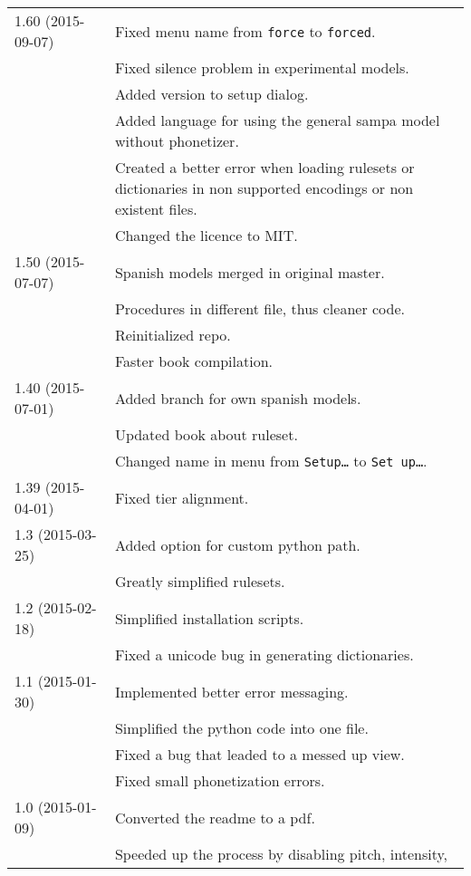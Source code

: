 \begin{longtable}{|p{0.22\linewidth}p{0.8\linewidth}|}
	\midrule
	1.60 (2015{-}09{-}07) & \tabitem{} Fixed menu name from \texttt{force} to
\texttt{forced}.\\
		& \tabitem{} Fixed silence problem in experimental models.\\
		& \tabitem{} Added version to setup dialog.\\
		& \tabitem{} Added language for using the general sampa model without
			phonetizer.\\
		& \tabitem{} Created a better error when loading rulesets or dictionaries in
			non supported encodings or non existent files.\\
		& \tabitem{} Changed the licence to MIT.\\
	\midrule
	1.50 (2015{-}07{-}07) & \tabitem{} Spanish models merged in original master.\\
		& \tabitem{} Procedures in different file, thus cleaner code.\\
		& \tabitem{} Reinitialized repo.\\
		& \tabitem{} Faster book compilation.\\
	\midrule
	1.40 (2015{-}07{-}01) & \tabitem{} Added branch for own spanish models.\\
		& \tabitem{} Updated book about ruleset.\\
		& \tabitem{} Changed name in menu from \texttt{Setup\ldots} to 
			\texttt{Set up\dots}.\\
	\midrule
	1.39 (2015{-}04{-}01) & \tabitem{} Fixed tier alignment.\\
	\midrule
	1.3 (2015{-}03{-}25) & \tabitem{} Added option for custom python path.\\
	 & \tabitem{} Greatly simplified rulesets.\\
	\midrule
	1.2 (2015{-}02{-}18) & \tabitem{} Simplified installation scripts.\\
		& \tabitem{} Fixed a unicode bug in generating dictionaries.\\
	\midrule
	1.1 (2015{-}01{-}30) & \tabitem{} Implemented better error messaging.\\
		& \tabitem{} Simplified the python code into one file.\\
		& \tabitem{} Fixed a bug that leaded to a messed up view.\\
		& \tabitem{} Fixed small phonetization errors.\\
	\midrule
	1.0 (2015{-}01{-}09) & \tabitem{} Converted the readme to a pdf.\\
		& \tabitem{} Speeded up the process by disabling pitch, intensity,

\end{longtable}
